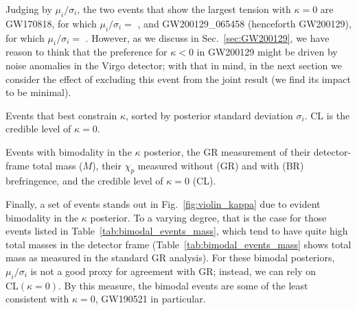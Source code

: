 \documentclass[aps,prd,twocolumn,superscriptaddress,preprintnumbers,floatfix,nofootinbib]{revtex4-2}
\begin{document}
Judging by $\mu_i/\sigma_i$, the two events that show the largest tension with $\kappa = 0$ are GW170818, for which $\mu_i / \sigma_i =$ , and GW200129\_065458 (henceforth GW200129), for which $\mu_i / \sigma_i =$ .
However, as we discuss in Sec.~\ref{sec:GW200129}, we have reason to think that the preference for $\kappa < 0$ in GW200129 might be driven by noise anomalies in the Virgo detector; with that in mind, in the next section we consider the effect of excluding this event from the joint result (we find its impact to be minimal).

\begin{table}
    \caption{Events that best constrain $\kappa$, sorted by posterior standard deviation $\sigma_i$. CL is the credible level of $\kappa = 0$.}
    \begin{ruledtabular}
    \end{ruledtabular}
    \label{tab:best_events_kappa}
\end{table}

\begin{table}
    \caption{Events with bimodality in the $\kappa$ posterior, the \ac{GR} measurement of their detector-frame total mass ($M$), their $\chi_p$ measured without (GR) and with (BR) brefringence, and the credible level of $\kappa = 0$ (CL).}
    \begin{ruledtabular}
    \end{ruledtabular}
    \label{tab:bimodal_events_mass}
\end{table}

Finally, a set of events stands out in Fig.~\ref{fig:violin_kappa} due to evident bimodality in the $\kappa$ posterior.
To a varying degree, that is the case for those events listed in Table~\ref{tab:bimodal_events_mass}, which tend to have quite high total masses in the detector frame (Table~\ref{tab:bimodal_events_mass} shows total mass as measured in the standard \ac{GR} analysis).
For these bimodal posteriors, $\mu_i/\sigma_i$ is not a good proxy for agreement with \ac{GR}; instead, we can rely on $\mathrm{CL}(\kappa = 0)$.
By this measure, the bimodal events are some of the least consistent with $\kappa = 0$, GW190521 in particular.
\end{document}

